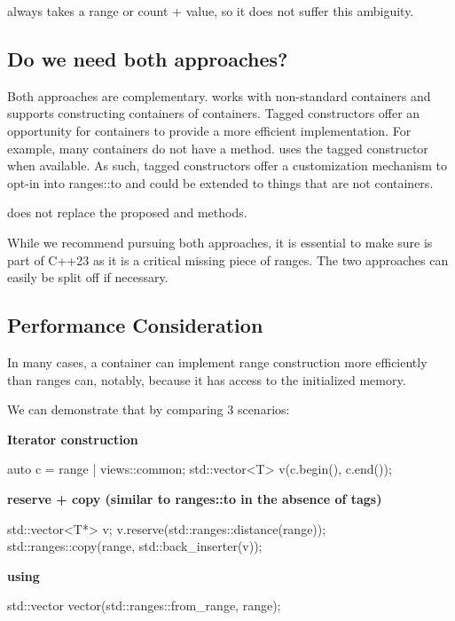 \documentclass{wg21}
\begin{document}
 always takes a range or count + value, so it does not suffer this ambiguity.

\subsection{Do we need both approaches?}
Both approaches are complementary.  works with non-standard containers and supports constructing containers of containers.
Tagged constructors offer an opportunity for containers to provide a more efficient implementation.
For example, many containers do not have a  method.
 uses the tagged constructor when available.
As such, tagged constructors offer a customization mechanism to opt-in into ranges::to and could be extended to things that are not containers.

 does not replace the proposed  and  methods.

While we recommend pursuing both approaches, it is essential to make sure  is part of C++23 as it is a critical missing piece of
ranges. The two approaches can easily be split off if necessary.

\subsection{Performance Consideration}

In many cases, a container can implement range construction more efficiently than ranges can,
notably, because it has access to the initialized memory.

We can demonstrate that by comparing 3 scenarios:

\textbf{Iterator construction}
\begin{colorblock}
    auto c = range | views::common;
    std::vector<T> v(c.begin(), c.end());
\end{colorblock}

\textbf{reserve + copy (similar to ranges::to in the absence of tags)}
\begin{colorblock}
    std::vector<T*> v;
    v.reserve(std::ranges::distance(range));
    std::ranges::copy(range, std::back_inserter(v));
\end{colorblock}

\textbf{using }
\begin{colorblock}
    std::vector vector(std::ranges::from_range, range);
\end{colorblock}
\end{document}
